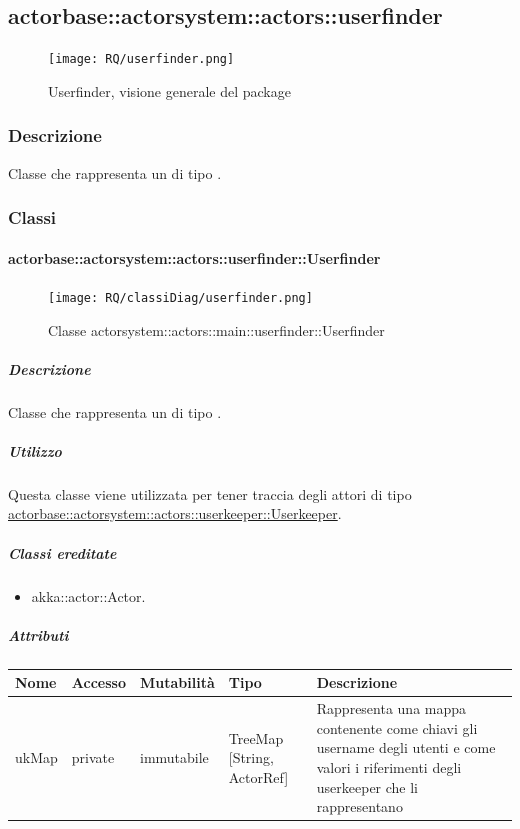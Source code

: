 \documentclass{scalatekids-article}
\begin{document}
\subsection{actorbase::actorsystem::actors::userfinder}
\label{sec:actorbase::actorsystem::actors::userfinder}

\begin{figure}[H]
  \begin{center}
    \texttt{[image: RQ/userfinder.png]}
    \caption{Userfinder, visione generale del package}
  \end{center}
\end{figure}

\subsubsection{Descrizione}
Classe che rappresenta un  di tipo .

\subsubsection{Classi}

\paragraph{actorbase::actorsystem::actors::userfinder::Userfinder}
\label{sec:actorbase::actorsystem::actors::userfinder::Userfinder}

\begin{figure}[H]
  \begin{center}
    \texttt{[image: RQ/classiDiag/userfinder.png]}
    \caption{Classe actorsystem::actors::main::userfinder::Userfinder}
  \end{center}
\end{figure}

\subparagraph{Descrizione}
Classe che rappresenta un  di tipo .

\subparagraph{Utilizzo}
Questa classe viene utilizzata per tener traccia degli attori di tipo
\hyperref[sec:actorbase::actorsystem::actors::userkeeper::Userkeeper]{actorbase::actorsystem::actors::userkeeper::Userkeeper}.

\subparagraph{Classi ereditate}
\begin{itemize}
\item akka::actor::Actor.
\end{itemize}

\subparagraph{Attributi}
\begin{tabular}{| p{3cm} | p{1.5cm} | p{2cm} | p{2cm} | p{8.5cm} |}
  \hline
  Nome & Accesso & Mutabilità & Tipo & Descrizione\\
  \hline
  ukMap & private & immutabile & TreeMap [String, ActorRef] & Rappresenta una mappa contenente come chiavi gli username degli utenti e come valori i riferimenti degli userkeeper che li rappresentano \\
  \hline
\end{tabular}
\end{document}
